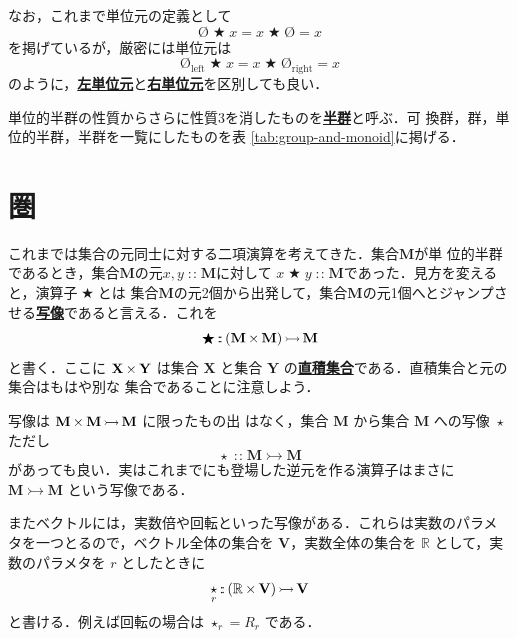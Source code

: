 \documentclass[a5paper,twoside,fleqn,draft]{jsbook}
\newcommand{\keyword}[1]{{\underline{\textbf{#1}}}}
\newcommand{\mZero}{\text{\O}}
\DeclareMathOperator{\mBinOp}{\bigstar}
\DeclareMathOperator{\mIn}{{:\!:}}
\DeclareMathOperator{\mMorphTo}{\rightarrowtail} %
\DeclareMathOperator{\mSetTimes}{\bf{\times}} %
\DeclareMathOperator{\mUnOp}{\star}
\newcommand{\mSpecialSub}[1]{\text{#1}}
\newcommand{\mLeft}{\mSpecialSub{left}}
\newcommand{\mRight}{\mSpecialSub{right}}
\newcommand{\mSet}[1]{\mathbf{#1}}
\newcommand{\mSpecialSet}[1]{\mathbb{#1}}
\newcommand{\mRSet}{\mSpecialSet{R}}
\newcommand{\mMorph}[2]{#1\mMorphTo#2} %
\begin{document}
なお，これまで単位元の定義として
\begin{equation}
\mZero\mBinOp x=x\mBinOp\mZero=x
\end{equation}
を掲げているが，厳密には単位元は
\begin{equation}
\mZero_\mLeft\mBinOp x=x\mBinOp\mZero_\mRight=x
\end{equation}
のように，\keyword{左単位元}と\keyword{右単位元}を区別しても良い．

単位的半群の性質からさらに性質3を消したものを\keyword{半群}と呼ぶ．可
換群，群，単位的半群，半群を一覧にしたものを表
\ref{tab:group-and-monoid}に掲げる．

\section{圏}

これまでは集合の元同士に対する二項演算を考えてきた．集合$\mSet{M}$が単
位的半群であるとき，集合$\mSet{M}$の元$x,y\mIn\mSet{M}$に対して
$x\mBinOp y\mIn\mSet{M}$であった．見方を変えると，演算子$\mBinOp$とは
集合$\mSet{M}$の元2個から出発して，集合$\mSet{M}$の元1個へとジャンプさ
せる\keyword{写像}であると言える．これを
\begin{equation}
\mBinOp\mIn{}\mMorph{(\mSet{M}\mSetTimes\mSet{M})}{\mSet{M}}
\end{equation}
と書く．ここに $\mSet{X}\mSetTimes\mSet{Y}$ は集合 $\mSet{X}$ と集合
$\mSet{Y}$ の\keyword{直積集合}である．直積集合と元の集合はもはや別な
集合であることに注意しよう．

写像は $\mMorph{\mSet{M}\mSetTimes\mSet{M}}{\mSet{M}}$ に限ったもの出
はなく，集合 $\mSet{M}$ から集合 $\mSet{M}$ への写像 $\mUnOp$ ただし
\begin{equation}
\mUnOp\mIn\mMorph{\mSet{M}}{\mSet{M}}
\end{equation}
があっても良い．実はこれまでにも登場した逆元を作る演算子はまさに
$\mMorph{\mSet{M}}{\mSet{M}}$ という写像である．

またベクトルには，実数倍や回転といった写像がある．これらは実数のパラメ
タを一つとるので，ベクトル全体の集合を $\mSet{V}$，実数全体の集合を
$\mRSet$ として，実数のパラメタを $r$ としたときに
\begin{equation}
\mUnOp_r\mIn{}\mMorph{(\mRSet\mSetTimes\mSet{V})}{\mSet{V}}
\end{equation}
と書ける．例えば回転の場合は $\mUnOp_r=R_r$ である．
\end{document}
